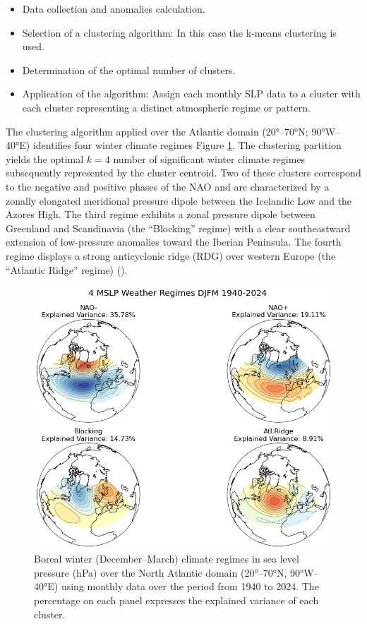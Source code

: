 \documentclass[
]{krantz}
\providecommand{\tightlist}{%
  \setlength{\itemsep}{0pt}\setlength{\parskip}{0pt}}
\begin{document}
\begin{itemize}
\tightlist
\item
  Data collection and anomalies calculation.
\item
  Selection of a clustering algorithm: In this case the k-means clustering is used.
\item
  Determination of the optimal number of clusters.
\item
  Application of the algorithm: Assign each monthly SLP data to a cluster with each cluster representing a distinct atmospheric regime or pattern.
\end{itemize}

The clustering algorithm applied over the Atlantic domain (20°--70°N; 90°W--40°E) identifies four winter climate regimes Figure \ref{fig:RegimesPamela}. The clustering partition yields the optimal \(k = 4\) number of significant winter climate regimes subsequently represented by the cluster centroid. Two of these clusters correspond to the negative and positive phases of the NAO and are characterized by a zonally elongated meridional pressure dipole between the Icelandic Low and the Azores High. The third regime exhibits a zonal pressure dipole between Greenland and Scandinavia (the ``Blocking'' regime) with a clear southeastward extension of low-pressure anomalies toward the Iberian Peninsula. The fourth regime displays a strong anticyclonic ridge (RDG) over western Europe (the ``Atlantic Ridge'' regime) (\citet{hurrell2010}).

\begin{figure}

{\centering \includegraphics[width=0.7\linewidth]{work/05_nao/figures/ClusterAnalysis} 

}

\caption{Boreal winter (December–March) climate regimes in sea level pressure (hPa) over the North Atlantic domain (20°–70°N, 90°W–40°E) using monthly data over the period from 1940 to 2024. The percentage on each panel expresses the explained variance of each cluster.}\label{fig:RegimesPamela}
\end{figure}
\end{document}
